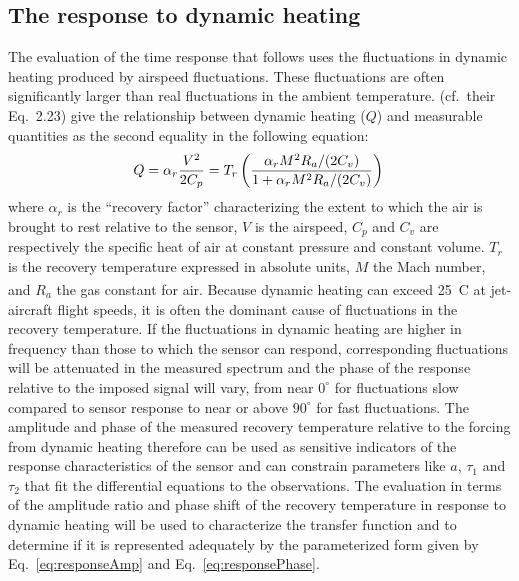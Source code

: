 \documentclass[amt, manuscript]{copernicus}
\begin{document}
\subsection{\texorpdfstring{The response to dynamic
heating\label{subsec:Dynamic-heating}}{The response to dynamic heating}}

The evaluation of the time response that follows uses the fluctuations
in dynamic heating produced by airspeed fluctuations. These fluctuations
are often significantly larger than real fluctuations in the ambient
temperature. \citet{BangeEtAl2013.ch2} (cf.~their Eq.~2.23) give the
relationship between dynamic heating (\(Q\)) and measurable quantities
as the second equality in the following equation: \begin{equation}
Q=\alpha_{r}\frac{V^{2}}{2C_{p}}=T_{r}\left(\frac{\alpha_{r}M^{2}R_{a}/(2C_{v})}{1+\alpha_{r}M^{2}R_{a}/(2C_{v})}\right){\label{eq:DHterm}}
\end{equation} where \(\alpha_{r}\) is the ``recovery factor''
characterizing the extent to which the air is brought to rest relative
to the sensor, \(V\) is the airspeed, \(C_{p}\) and \(C_{v}\) are
respectively the specific heat of air at constant pressure and constant
volume. \(T_{r}\) is the recovery temperature expressed in absolute
units, \(M\) the Mach number, and \(R_{a}\) the gas constant for air.
Because dynamic heating can exceed \unit{25^{\circ}C} at jet-aircraft
flight speeds, it is often the dominant cause of fluctuations in the
recovery temperature. If the fluctuations in dynamic heating are higher
in frequency than those to which the sensor can respond, corresponding
fluctuations will be attenuated in the measured spectrum and the phase
of the response relative to the imposed signal will vary, from near
\(0^{\circ}\) for fluctuations slow compared to sensor response to near
or above \(90^{\circ}\) for fast fluctuations. The amplitude and phase
of the measured recovery temperature relative to the forcing from
dynamic heating therefore can be used as sensitive indicators of the
response characteristics of the sensor and can constrain parameters like
\(a\), \(\tau_{1}\) and \(\tau_{2}\) that fit the differential equations
to the observations. The evaluation in terms of the amplitude ratio and
phase shift of the recovery temperature in response to dynamic heating
will be used to characterize the transfer function and to determine if
it is represented adequately by the parameterized form given by
Eq.~\eqref{eq:responseAmp} and Eq.~\eqref{eq:responsePhase}.
\end{document}
